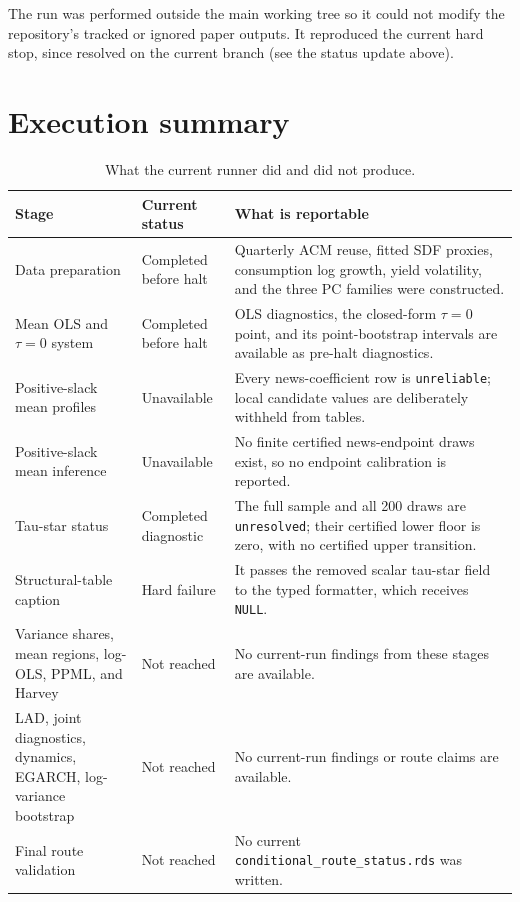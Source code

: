 \documentclass[11pt]{article}
\begin{document}
The run was performed outside the main working tree so it could not modify
the repository's tracked or ignored paper outputs. It reproduced the current
hard stop, since resolved on the current branch (see the status update above).

\section{Execution summary}

\begin{table}[ht]
\centering
\small
\begin{tabularx}{\textwidth}{@{}p{}p{}X@{}}
\toprule
Stage & Current status & What is reportable \\
\midrule
Data preparation & Completed before halt &
  Quarterly ACM reuse, fitted SDF proxies, consumption log growth, yield
  volatility, and the three PC families were constructed. \\
Mean OLS and $\tau=0$ system & Completed before halt &
  OLS diagnostics, the closed-form $\tau=0$ point, and its point-bootstrap
  intervals are available as pre-halt diagnostics. \\
Positive-slack mean profiles & Unavailable &
  Every news-coefficient row is \texttt{unreliable}; local candidate values
  are deliberately withheld from tables. \\
Positive-slack mean inference & Unavailable &
  No finite certified news-endpoint draws exist, so no endpoint calibration
  is reported. \\
Tau-star status & Completed diagnostic &
  The full sample and all 200 draws are \texttt{unresolved}; their certified
  lower floor is zero, with no certified upper transition. \\
Structural-table caption & Hard failure &
  It passes the removed scalar tau-star field to the typed formatter, which
  receives \texttt{NULL}. \\
Variance shares, mean regions, log-OLS, PPML, and Harvey &
  Not reached &
  No current-run findings from these stages are available. \\
LAD, joint diagnostics, dynamics, EGARCH, log-variance bootstrap &
  Not reached &
  No current-run findings or route claims are available. \\
Final route validation & Not reached &
  No current \texttt{conditional\_route\_status.rds} was written. \\
\bottomrule
\end{tabularx}
\caption{What the current runner did and did not produce.}
\end{table}
\end{document}
